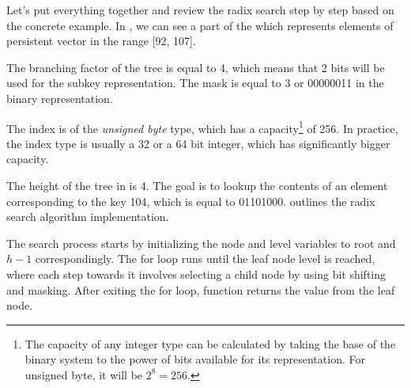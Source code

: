 \begin{figure}
\end{figure}

Let's put everything together and review the radix search step by step based on the concrete example. In , we can see a part of the \rbtree{} which represents elements of persistent vector in the range [92, 107].

The branching factor of the tree is equal to 4, which means that 2 bits will be used for the subkey representation. The mask is equal to 3 or 00000011 in the binary representation.

The index is of the \emph{unsigned byte} type, which has a capacity\footnote{The capacity of any integer type can be calculated by taking the base of the binary system to the power of bits available for its representation. For unsigned byte, it will be $2^8 = 256$.} of 256. In practice, the index type is usually a 32 or a 64 bit integer, which has significantly bigger capacity.

The height of the tree in  is 4. The goal is to lookup the contents of an element corresponding to the key 104, which is equal to 01101000.  outlines the radix search algorithm implementation. 

The search process starts by initializing the node and level variables to root and $h - 1$ correspondingly. The for loop runs until the leaf node level is reached, where each step towards it involves selecting a child node by using bit shifting and masking. After exiting the for loop, function returns the value from the leaf node. 


